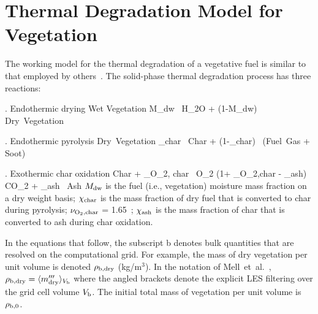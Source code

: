 \documentclass[11pt]{book}
\begin{document}
\section{Thermal Degradation Model for Vegetation}

The working model for the thermal degradation of a vegetative fuel is similar to that employed by others~\cite{Porterie:2006,Morvan:CF2004,Houssami:2016}. The solid-phase thermal degradation process has three reactions:

. Endothermic drying
\be
 {\rm Wet Vegetation} \rightarrow M_{\rm dw} \, {\rm H_2O} + (1-M_{\rm dw}) \, {\rm Dry\ Vegetation}
\ee

. Endothermic pyrolysis
\be
 {\rm Dry\ Vegetation} \rightarrow \chi_{\rm char} \, {\rm Char} + (1-\chi_{\rm char}) \, ({\rm Fuel\ Gas + Soot})
\ee

. Exothermic char oxidation
\be
 {\rm Char} + \nu_{\rm O_2, char} \, {\rm O_2} \rightarrow (1+ \nu_{\rm O_2,char} - \chi_{\rm ash}) \, {\rm CO_2} + \chi_{\rm ash} \, {\rm Ash}
\ee
$M_{\rm dw}$ is the fuel (i.e., vegetation) moisture mass fraction on a dry weight basis;  $\chi_{\rm char}$ is the mass fraction of dry fuel that is converted to char during pyrolysis;  $\nu_{\rm O_2,char}$ = 1.65~\cite{Porterie:2006};  $\chi_{\rm ash}$ is the mass fraction of char that is converted to ash during char oxidation.

In the equations that follow, the subscript b denotes bulk quantities that are resolved on the computational grid. For example, the mass of dry vegetation per unit volume is denoted $\rho_{\rm b,dry}$ (kg/m$^{3}$).  In the notation of Mell~et~al.~\cite{Mell:2009}, $\rho_{\rm b,dry}=\langle m^{\prime\prime\prime}_{\rm dry}\rangle_{V_{\rm b}}$ where the angled brackets denote the explicit LES filtering over the grid cell volume $V_{\rm b}$. The initial total mass of vegetation per unit volume is $\rho_{\rm b,0}$.
\end{document}
